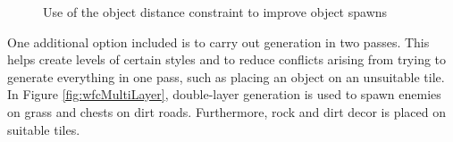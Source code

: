 \begin{figure}[H]
    \centering
    \hfill
    \caption{Use of the object distance constraint to improve object spawns \cite{WFC_Automatic_Rules_And_Better_Symmetries}}
    \label{fig:wfcDistanceConstraint}
\end{figure}

One additional option included is to carry out generation in two passes. This helps create levels of certain styles and to reduce conflicts arising from trying to generate everything in one pass, such as placing an object on an unsuitable tile. In Figure \ref{fig:wfcMultiLayer}, double-layer generation is used to spawn enemies on grass and chests on dirt roads. Furthermore, rock and dirt decor is placed on suitable tiles.

